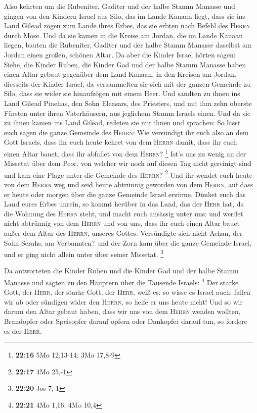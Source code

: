  Also kehrten um die Rubeniter, Gaditer und der halbe
Stamm Manasse und gingen von den Kindern Israel aus Silo, das im Lande
Kanaan liegt, dass sie ins Land Gilead zögen zum Lande ihres Erbes, das
sie erbten nach Befehl des \textsc{Herrn} durch Mose. 
Und da sie kamen in die Kreise am Jordan, die im Lande Kanaan liegen,
bauten die Rubeniter, Gaditer und der halbe Stamm Manasse daselbst am
Jordan einen großen, schönen Altar.  Da aber die Kinder
Israel hörten sagen: Siehe, die Kinder Ruben, die Kinder Gad und der
halbe Stamm Manasse haben einen Altar gebaut gegenüber dem Land Kanaan,
in den Kreisen am Jordan, diesseits der Kinder Israel, 
da versammelten sie sich mit der ganzen Gemeinde zu Silo, dass sie wider
sie hinaufzögen mit einem Heer.  Und sandten zu ihnen ins
Land Gilead Pinehas, den Sohn Eleasars, des Priesters, 
und mit ihm zehn oberste Fürsten unter ihren Vaterhäusern, aus jeglichem
Stamm Israels einen.  Und da sie zu ihnen kamen ins Land
Gilead, redeten sie mit ihnen und sprachen:  So lässt
euch sagen die ganze Gemeinde des \textsc{Herrn}: Wie versündigt ihr
euch also an dem Gott Israels, dass ihr euch heute kehret von dem
\textsc{Herrn} damit, dass ihr euch einen Altar bauet, dass ihr abfallet
von dem \textsc{Herrn}? \footnote{\textbf{22:16} 5Mo 12,13-14; 3Mo
  17,8-9}  Ist's uns zu wenig an der Missetat über dem
Peor, von welcher wir noch auf diesen Tag nicht gereinigt sind und kam
eine Plage unter die Gemeinde des \textsc{Herrn}? \footnote{\textbf{22:17}
  4Mo 25,-1}  Und ihr wendet euch heute von dem
\textsc{Herrn} weg und seid heute abtrünnig geworden von dem
\textsc{Herrn}, auf dass er heute oder morgen über die ganze Gemeinde
Israel erzürne.  Dünket euch das Land eures Erbes unrein,
so kommt herüber in das Land, das der \textsc{Herr} hat, da die Wohnung
des \textsc{Herrn} steht, und macht euch ansässig unter uns; und werdet
nicht abtrünnig von dem \textsc{Herrn} und von uns, dass ihr euch einen
Altar bauet außer dem Altar des \textsc{Herrn}, unseres Gottes.
 Versündigte sich nicht Achan, der Sohn Serahs, am
Verbannten? und der Zorn kam über die ganze Gemeinde Israel, und er ging
nicht allein unter über seiner Missetat. \footnote{\textbf{22:20} Jos
  7,-1}

 Da antworteten die Kinder Ruben und die Kinder Gad und
der halbe Stamm Manasse und sagten zu den Häuptern über die Tausende
Israels: \footnote{\textbf{22:21} 4Mo 1,16; 4Mo 10,4} 
Der starke Gott, der \textsc{Herr}, der starke Gott, der \textsc{Herr},
weiß es; so wisse es Israel auch: fallen wir ab oder sündigen wider den
\textsc{Herrn}, so helfe er uns heute nicht!  Und so wir
darum den Altar gebaut haben, dass wir uns von dem \textsc{Herrn} wenden
wollten, Brandopfer oder Speisopfer darauf opfern oder Dankopfer darauf
tun, so fordere es der \textsc{Herr}.

